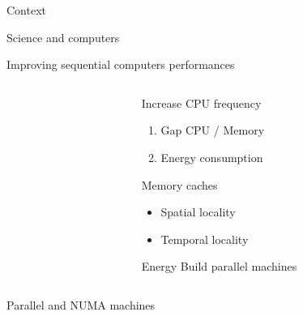 \documentclass[xcolor={usenames,dvipsnames},hyperref={pdfusetitle}]{beamer}
\begin{document}
\begin{section}{Context}

\begin{frame}{Science and computers}
    
\end{frame}

\begin{frame}{Improving sequential computers performances}
    \begin{columns}
        \begin{column}{.45\textwidth}
            \centering
            
            \begin{block}{}
            \end{block}
        \end{column}
        \begin{column}{.45\textwidth}
            \pause
            \begin{block}{Increase CPU frequency}
                \begin{enumerate}
                    \item Gap CPU / Memory
                    \item Energy consumption
                \end{enumerate}
            \end{block}
            \pause
            \begin{alertblock}{Memory caches}
                \begin{itemize}
                    \item Spatial locality
                    \item Temporal locality
                \end{itemize}
            \end{alertblock}
            \pause
            \begin{alertblock}{Energy}
                Build parallel machines
            \end{alertblock}
        \end{column}
    \end{columns}
\end{frame}

\begin{frame}{Parallel and NUMA machines}
    \begin{columns}
        \begin{column}{.2\linewidth}
            \begin{block}{}
            \end{block}
        \end{column}
        \begin{column}{.8\linewidth}
            \centering
            \scalebox{.6}{
                
            }
        \end{column}
    \end{columns}
\end{frame}


\end{section}
\end{document}
